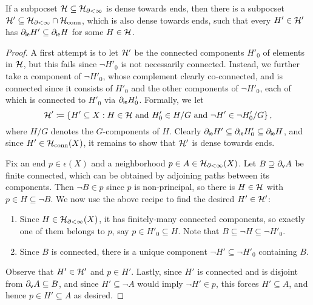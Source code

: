 \documentclass[reqno]{amsart}
\begin{document}
    \begin{lemma}\label{lem:connected_witness_to_density}
        If a subpocset $\mathcal{H}\subseteq\mathcal{H}_{\partial<\infty}$ is dense towards ends, then there is a subpocset $\mathcal{H}'\subseteq\mathcal{H}_{\partial<\infty}\cap\mathcal{H}_\mathrm{conn}$, which is also dense towards ends, such that every $H'\in\mathcal{H}'$ has $\partial_\mathsf{ie}H'\subseteq\partial_\mathsf{ie}H$ for some $H\in\mathcal{H}$.
    \end{lemma}
    \begin{proof}
        A first attempt is to let $\mathcal{H}'$ be the connected components $H'_0$ of elements in $\mathcal{H}$, but this fails since $\lnot H'_0$ is not necessarily connected. Instead, we further take a component of $\lnot H'_0$, whose complement clearly co-connected, and is connected since it consists of $H'_0$ and the other components of $\lnot H'_0$, each of which is connected to $H'_0$ via $\partial_\mathsf{ie}H'_0$. Formally, we let
        \begin{equation*}
            \mathcal{H}'\coloneqq\left\{H'\subseteq X: H\in\mathcal{H}\textrm{ and }H'_0\in H/G\textrm{ and }\lnot H'\in\lnot H'_0/G\right\},
        \end{equation*}
        where $H/G$ denotes the $G$-components of $H$. Clearly $\partial_\mathsf{ie}H'\subseteq\partial_\mathsf{ie}H'_0\subseteq\partial_\mathsf{ie}H$, and since $H'\in\mathcal{H}_\mathrm{conn}(X)$, it remains to show that $\mathcal{H}'$ is dense towards ends.

        Fix an end $p\in\epsilon(X)$ and a neighborhood $p\in A\in\mathcal{H}_{\partial<\infty}(X)$. Let $B\supseteq\partial_\mathsf{v}A$ be finite connected, which can be obtained by adjoining paths between its components. Then $\lnot B\in p$ since $p$ is non-principal, so there is $H\in\mathcal{H}$ with $p\in H\subseteq\lnot B$. We now use the above recipe to find the desired $H'\in\mathcal{H}'$:
            \begin{enumerate}
                \item Since $H\in\mathcal{H}_{\partial<\infty}(X)$, it has finitely-many connected components, so exactly one of them belongs to $p$, say $p\in H'_0\subseteq H$. Note that $B\subseteq\lnot H\subseteq\lnot H'_0$.
                \item Since $B$ is connected, there is a unique component $\lnot H'\subseteq\lnot H'_0$ containing $B$.
            \end{enumerate}
        Observe that $H'\in\mathcal{H}'$ and $p\in H'$. Lastly, since $H'$ is connected and is disjoint from $\partial_\mathsf{v}A\subseteq B$, and since $H'\subseteq\lnot A$ would imply $\lnot H'\in p$, this forces $H'\subseteq A$, and hence $p\in H'\subseteq A$ as desired.
    \end{proof}
\end{document}
